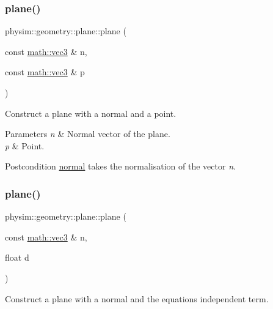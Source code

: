 \subsubsection{\texorpdfstring{plane()}{plane()}\hspace{0.1cm}{\footnotesize\ttfamily [1/3]}}
{\footnotesize\ttfamily physim\+::geometry\+::plane\+::plane (\begin{DoxyParamCaption}\item[{const \hyperlink{structphysim_1_1math_1_1vec3}{math\+::vec3} \&}]{n,  }\item[{const \hyperlink{structphysim_1_1math_1_1vec3}{math\+::vec3} \&}]{p }\end{DoxyParamCaption})}



Construct a plane with a normal and a point. 


\begin{DoxyParams}{Parameters}
{\em n} & Normal vector of the plane. \\
\hline
{\em p} & Point. \\
\hline
\end{DoxyParams}
\begin{DoxyPostcond}{Postcondition}
\hyperlink{classphysim_1_1geometry_1_1plane_a51656a31e9c941542f17d47d2ab976bf}{normal} takes the normalisation of the vector {\itshape n}. 
\end{DoxyPostcond}
\mbox{\label{classphysim_1_1geometry_1_1plane_aae52703bb0288ee3412d066475927253}} 
\subsubsection{\texorpdfstring{plane()}{plane()}\hspace{0.1cm}{\footnotesize\ttfamily [2/3]}}
{\footnotesize\ttfamily physim\+::geometry\+::plane\+::plane (\begin{DoxyParamCaption}\item[{const \hyperlink{structphysim_1_1math_1_1vec3}{math\+::vec3} \&}]{n,  }\item[{float}]{d }\end{DoxyParamCaption})}



Construct a plane with a normal and the equation\textquotesingle{}s independent term. 

